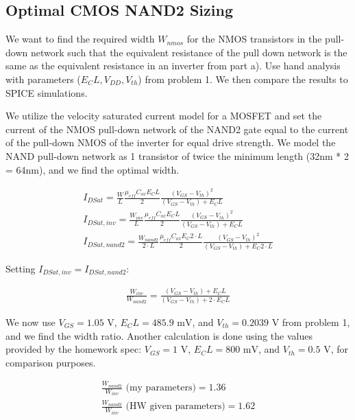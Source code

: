 \documentclass[11pt]{article}
\begin{document}
\subsection{Optimal CMOS NAND2 Sizing}
We want to find the required width $W_{nmos}$ for the NMOS transistors in the pull-down network such that the equivalent resistance of the pull down network is the same as the equivalent resistance in an inverter from part a). Use hand analysis with parameters ($E_C L, V_{DD}, V_{th}$) from problem 1. We then compare the results to SPICE simulations.

We utilize the velocity saturated current model for a MOSFET and set the current of the NMOS pull-down network of the NAND2 gate equal to the current of the pull-down NMOS of the inverter for equal drive strength. We model the NAND pull-down network as 1 transistor of twice the minimum length (32nm * 2 = 64nm), and we find the optimal width.

\begin{eqnarray}
	I_{DSat} = \frac{W}{L} \frac{\mu_{eff} C_{ox} E_C L}{2} \frac{(V_{GS} - V_{th})^2}{(V_{GS} - V_{th}) + E_C L} \nonumber \\
	I_{DSat,inv} = \frac{W_{inv}}{L} \frac{\mu_{eff} C_{ox} E_C L}{2} \frac{(V_{GS} - V_{th})^2}{(V_{GS} - V_{th}) + E_C L} \nonumber \\
	I_{DSat,nand2} = \frac{W_{nand2}}{2 \cdot L} \frac{\mu_{eff} C_{ox} E_C 2 \cdot L}{2} \frac{(V_{GS} - V_{th})^2}{(V_{GS} - V_{th}) + E_C 2 \cdot L} \nonumber
\end{eqnarray}

Setting $I_{DSat,inv} = I_{DSat,nand2}$:

\begin{eqnarray}
	\frac{W_{inv}}{W_{nand2}} = \frac{(V_{GS} - V_{th}) + E_C L}{(V_{GS} - V_{th}) + 2 \cdot E_C L} \nonumber
\end{eqnarray}

We now use $V_{GS} = 1.05 \text{ V}$, $E_C L = 485.9 \text{ mV}$, and $V_{th} = 0.2039 \text{ V}$ from problem 1, and we find the width ratio. Another calculation is done using the values provided by the homework spec: $V_{GS} = 1 \text{ V}$, $E_C L = 800 \text{ mV}$, and $V_{th} = 0.5 \text{ V}$, for comparison purposes.

\begin{eqnarray}
	\frac{W_{nand2}}{W_{inv}} \text{ (my parameters)} = 1.36 \nonumber \\
	\frac{W_{nand2}}{W_{inv}} \text{ (HW given parameters)} = 1.62 \nonumber
\end{eqnarray}
\end{document}
